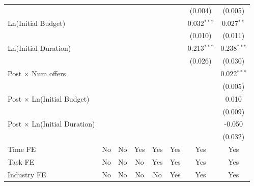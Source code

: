 \documentclass[
]{article}
\begin{document}
\begin{table}[htbp]
\begin{tabular}{lccccccc}
                                          &                &                &               &               &               & (0.004)       & (0.005)\\   
      Ln(Initial Budget)                  &                &                &               &               &               & 0.032$^{***}$ & 0.027$^{**}$\\   
                                          &                &                &               &               &               & (0.010)       & (0.011)\\   
      Ln(Initial Duration)                &                &                &               &               &               & 0.213$^{***}$ & 0.238$^{***}$\\   
                                          &                &                &               &               &               & (0.026)       & (0.030)\\   
      Post $\times$ Num offers            &                &                &               &               &               &               & 0.022$^{***}$\\   
                                          &                &                &               &               &               &               & (0.005)\\   
      Post $\times$ Ln(Initial Budget)    &                &                &               &               &               &               & 0.010\\   
                                          &                &                &               &               &               &               & (0.009)\\   
      Post $\times$ Ln(Initial Duration)  &                &                &               &               &               &               & -0.050\\   
                                          &                &                &               &               &               &               & (0.032)\\   
      Time FE                             & No             & No             & Yes           & Yes           & Yes           & Yes           & Yes\\  
      Task FE                             & No             & No             & No            & Yes           & Yes           & Yes           & Yes\\  
      Industry FE                         & No             & No             & No            & No            & Yes           & Yes           & Yes\\  

\end{tabular}
\end{table}
\end{document}
